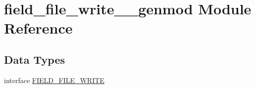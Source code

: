 \hypertarget{namespacefield__file__write____genmod}{}\section{field\+\_\+file\+\_\+write\+\_\+\+\_\+genmod Module Reference}
\label{namespacefield__file__write____genmod}
\subsection*{Data Types}
\begin{DoxyCompactItemize}
\item 
interface \mbox{\hyperlink{interfacefield__file__write____genmod_1_1_f_i_e_l_d___f_i_l_e___w_r_i_t_e}{F\+I\+E\+L\+D\+\_\+\+F\+I\+L\+E\+\_\+\+W\+R\+I\+TE}}
\end{DoxyCompactItemize}
